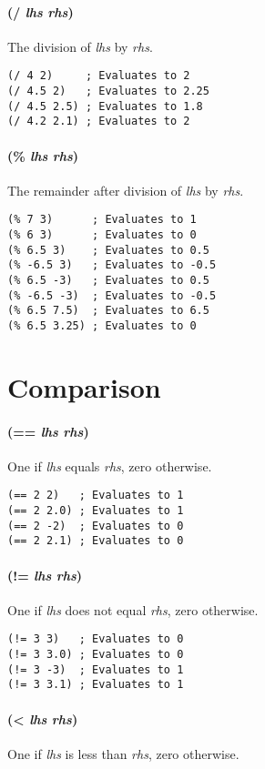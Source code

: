 \documentclass[twoside=false, numbers=noenddot]{scrbook}
\begin{document}
\paragraph{(/ \emph{lhs} \emph{rhs})}
The division of \emph{lhs} by \emph{rhs}.

\begin{verbatim}
(/ 4 2)     ; Evaluates to 2
(/ 4.5 2)   ; Evaluates to 2.25
(/ 4.5 2.5) ; Evaluates to 1.8
(/ 4.2 2.1) ; Evaluates to 2
\end{verbatim}

\paragraph{(\% \emph{lhs} \emph{rhs})}
The remainder after division of \emph{lhs} by \emph{rhs}.

\begin{verbatim}
(% 7 3)      ; Evaluates to 1
(% 6 3)      ; Evaluates to 0
(% 6.5 3)    ; Evaluates to 0.5
(% -6.5 3)   ; Evaluates to -0.5
(% 6.5 -3)   ; Evaluates to 0.5
(% -6.5 -3)  ; Evaluates to -0.5
(% 6.5 7.5)  ; Evaluates to 6.5
(% 6.5 3.25) ; Evaluates to 0
\end{verbatim}

\section{Comparison}
\paragraph{(== \emph{lhs} \emph{rhs})}
One if \emph{lhs} equals \emph{rhs}, zero otherwise.

\begin{verbatim}
(== 2 2)   ; Evaluates to 1
(== 2 2.0) ; Evaluates to 1
(== 2 -2)  ; Evaluates to 0
(== 2 2.1) ; Evaluates to 0
\end{verbatim}

\paragraph{(!= \emph{lhs} \emph{rhs})}
One if \emph{lhs} does not equal \emph{rhs}, zero otherwise.

\begin{verbatim}
(!= 3 3)   ; Evaluates to 0
(!= 3 3.0) ; Evaluates to 0
(!= 3 -3)  ; Evaluates to 1
(!= 3 3.1) ; Evaluates to 1
\end{verbatim}

\paragraph{(< \emph{lhs} \emph{rhs})}
One if \emph{lhs} is less than \emph{rhs}, zero otherwise.
\end{document}
